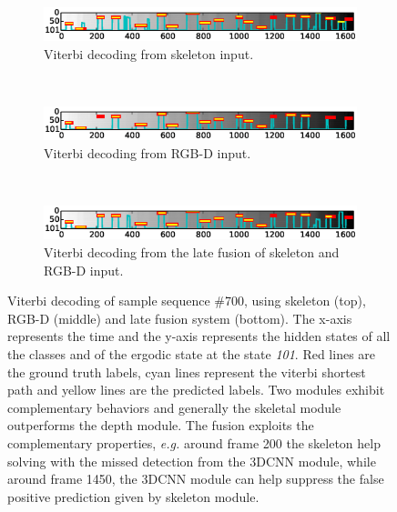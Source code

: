 \begin{figure}[t]
        \centering
        \begin{subfigure}[c]{.8\textwidth}
                \includegraphics[width=\textwidth]{images/path/Sample0700_sk}
                \caption{Viterbi decoding from skeleton input.}
                \label{Sample0700_sk}
        \end{subfigure}%
        ~ %

        \begin{subfigure}[c]{0.8\textwidth}
                \includegraphics[width=\textwidth]{images/path/Sample0700_cnn}
                \caption{Viterbi decoding from RGB-D input.}
                \label{Sample0700_cnn}
        \end{subfigure}

        ~ %
        \begin{subfigure}[c]{0.8\textwidth}
                \includegraphics[width=\textwidth]{images/path/Sample0700_combined}
                \caption{Viterbi decoding from the late fusion of skeleton and RGB-D input.}
                \label{Sample0700_combined}
        \end{subfigure}

  \caption{Viterbi decoding of sample sequence \#700, using skeleton (top), RGB-D (middle) and late fusion system (bottom). The x-axis represents the time and the y-axis represents the hidden states of all the classes and of the ergodic state at the state \emph{101}. Red lines are the ground truth labels, cyan lines represent the viterbi shortest path and yellow lines are the predicted labels. Two modules exhibit complementary behaviors and generally the skeletal module outperforms the depth module. The fusion exploits the complementary properties, \emph{e.g.} around frame 200 the skeleton help solving with the missed detection from the 3DCNN module, while around frame 1450, the 3DCNN module can help suppress the false positive prediction given by skeleton module.
  }\label{fig:Sample0700_comparison}
\end{figure}

